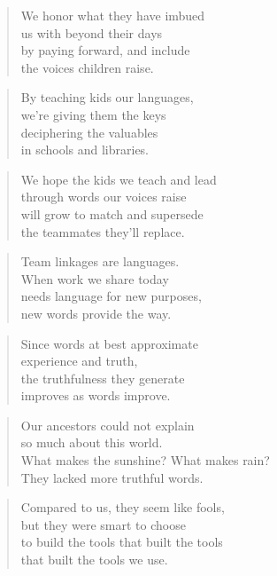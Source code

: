 \documentclass[14pt,a4paper]{article}
\begin{document}
\begin{verse}
We honor what they have imbued\\
us with beyond their days\\
by paying forward, and include\\
the voices children raise.
\end{verse}

\begin{verse}
By teaching kids our languages,\\
we’re giving them the keys\\
deciphering the valuables\\
in schools and libraries.
\end{verse}

\begin{verse}
We hope the kids we teach and lead\\
through words our voices raise\\
will grow to match and supersede\\
the teammates they’ll replace.
\end{verse}

\begin{verse}
Team linkages are languages.\\
When work we share today\\
needs language for new purposes,\\
new words provide the way.
\end{verse}

\begin{verse}
Since words at best approximate\\
experience and truth,\\
the truthfulness they generate\\
improves as words improve.
\end{verse}

\begin{verse}
Our ancestors could not explain\\
so much about this world.\\
What makes the sunshine? What makes rain?\\
They lacked more truthful words.
\end{verse}

\begin{verse}
Compared to us, they seem like fools,\\
but they were smart to choose\\
to build the tools that built the tools\\
that built the tools we use.
\end{verse}
\end{document}
